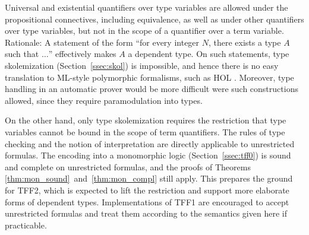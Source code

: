 
Universal and existential quantifiers over type variables are allowed under the
propositional connectives, including equivalence, as well as under other
quantifiers over type variables, but not in the scope of a quantifier over a
term variable.
Rationale: A statement of the form ``for every integer $N$, there exists a type
$A$ such that $\ldots$'' effectively makes $A$ a dependent type.
On such statements, type skolemization (Section~\ref{ssec:skol}) is impossible,
and hence there is no easy translation to ML-style polymorphic formalisms,
such as HOL \cite{gordon-melham-1993}. Moreover, type handling in an automatic
prover would be more difficult were such constructions allowed, since they
require paramodulation into types.

On the other hand, only type skolemization requires the restriction that type
variables cannot be bound in the scope of term quantifiers. The rules of type
checking and the notion of interpretation are directly applicable to
unrestricted formulas. The encoding into a monomorphic logic
(Section~\ref{ssec:tff0}) is sound and complete on unrestricted formulas, and
the proofs of Theorems \ref{thm:mon_sound}~and~\ref{thm:mon_compl} still
apply. This prepares the ground for TFF2, which is expected to lift the
restriction and support more elaborate forms of dependent types. Implementations
of TFF1 are encouraged to accept unrestricted formulas and treat them according
to the semantics given here if practicable.

